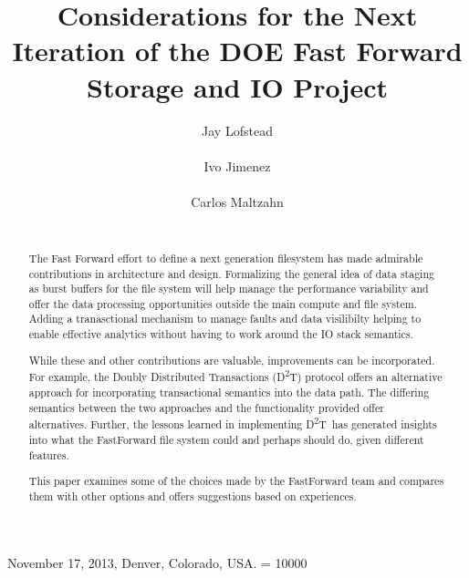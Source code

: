 \documentclass[conference]{sig-alt-gov2}
\newcommand{\DDT}{D\textsuperscript{2}T~}
\newcommand{\DDTns}{D\textsuperscript{2}T}
\begin{document}
 {November 17, 2013, Denver, Colorado, USA.}
\widowpenalty = 10000

\title{Considerations for the Next Iteration of the DOE Fast Forward Storage and IO Project}

\author{
\alignauthor Jay Lofstead\\
       \\
\alignauthor Ivo Jimenez\\
       \\
\alignauthor Carlos Maltzahn\\
       \\
}
\maketitle

\begin{abstract}
The Fast Forward effort to define a next generation filesystem has made
admirable contributions in architecture and design. Formalizing the general
idea of data staging as burst buffers for the file system will help manage
the performance variability and offer the data processing opportunities
outside the main compute and file system. Adding a tranasctional mechanism to
manage faults and data visilibilty helping to enable effective analytics
without having to work around the IO stack semantics.

While these and other contributions are valuable, improvements can be
incorporated. For example, the Doubly Distributed Transactions (\DDTns)
protocol offers an alternative approach for incorporating transactional
semantics into the data path. The differing semantics between the two
approaches and the functionality provided offer alternatives. Further, the
lessons learned in implementing \DDT has generated insights into what the
FastForward file system could and perhaps should do, given different features.

This paper examines some of the choices made by the FastForward team and
compares them with other options and offers suggestions based on experiences.

\end{abstract}
\end{document}
